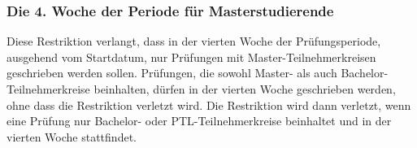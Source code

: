 \subsubsection{Die 4. Woche der Periode für Masterstudierende}
Diese Restriktion verlangt, dass in der vierten Woche der Prüfungsperiode,
ausgehend vom Startdatum, nur Prüfungen mit Master-Teilnehmerkreisen geschrieben werden sollen.
Prüfungen, die sowohl Master- als auch Bachelor-Teilnehmerkreise beinhalten, dürfen in der vierten
Woche geschrieben werden, ohne dass die Restriktion verletzt wird.
Die Restriktion wird dann verletzt, wenn eine Prüfung nur Bachelor- oder PTL-Teilnehmerkreise
beinhaltet und in der vierten Woche stattfindet.